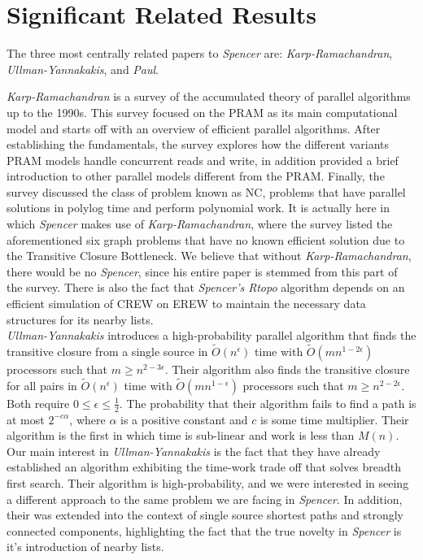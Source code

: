 \documentclass[paper=a4, fontsize=11pt]{scrartcl} %
\numberwithin{equation}{section} %
\numberwithin{figure}{section} %
\numberwithin{table}{section} %
\begin{document}
\section{Significant Related Results}

The three most centrally related papers to \textit{Spencer\cite{S97}} are:  \textit{Karp-Ramachandran\cite{KR90}}, \textit{Ullman-Yannakakis\cite{UY91}}, and \textit{Paul\cite{P83}}.

\textit{Karp-Ramachandran\cite{KR90}} is a survey of the accumulated theory of parallel algorithms up to the 1990s. This survey focused on the PRAM as its main computational model and starts off with an overview of efficient parallel algorithms. After establishing the fundamentals, the survey explores how the different variants PRAM models handle concurrent reads and write, in addition provided a brief introduction to other parallel models different from the PRAM. Finally, the survey discussed the class of problem known as NC, problems that have parallel solutions in polylog time and perform polynomial work.  It is actually here in which \textit{Spencer\cite{S97}} makes use of \textit{Karp-Ramachandran\cite{KR90}}, where the survey listed the aforementioned six graph problems that have no known efficient solution due to the Transitive Closure Bottleneck. We believe that without \textit{Karp-Ramachandran\cite{KR90}}, there would be no \textit{Spencer\cite{S97}}, since his entire paper is stemmed from this part of the survey. There is also the fact that \textit{Spencer\cite{S97}'s Rtopo} algorithm depends on an efficient simulation of CREW on EREW to maintain the necessary data structures for its nearby lists.\\

\textit{Ullman-Yannakakis\cite{UY91}} introduces a high-probability parallel algorithm that finds the transitive closure from a single source in $\tilde{O}(n^\epsilon)$ time with $\tilde{O}(mn^{1-2\epsilon})$ processors such that $m \geq n^{2-3\epsilon}$. Their algorithm also finds the transitive closure for all pairs in $\tilde{O}(n^\epsilon)$ time with $\tilde{O}(mn^{1-\epsilon})$ processors such that $m \geq n^{2-2\epsilon}$. Both require $0 \leq \epsilon \leq \frac{1}{2}$. The probability that their algorithm fails to find a path is at most $2^{-c\alpha}$, where $\alpha$ is a positive constant and $c$ is some time multiplier. Their algorithm is the first in which time is sub-linear and work is less than $M(n)$. Our main interest in \textit{Ullman-Yannakakis\cite{UY91}} is the fact that they have already established an algorithm exhibiting the time-work trade off that solves breadth first search. Their algorithm is high-probability, and we were interested in seeing a different approach to the same problem we are facing in \textit{Spencer\cite{S97}}. In addition, their was extended into the context of single source shortest paths and strongly connected components, highlighting the fact that the true novelty in \textit{Spencer\cite{S97}} is it's introduction of nearby lists.
\end{document}
